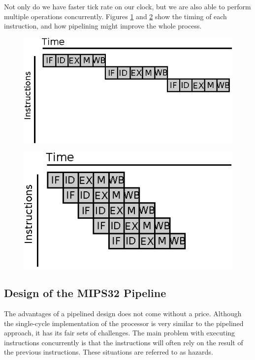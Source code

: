 Not only do we have faster tick rate on our clock, but we are also able to
perform multiple operations concurrently. Figures \ref{fig:single_cycle_time}
and \ref{fig:pipeline_time} show the timing of each instruction, and how
pipelining might improve the whole process.
\begin{figure}[H]
        \includegraphics{pipeline/single_cycle.eps}
        \label{fig:single_cycle_time}
\end{figure}
\begin{figure}[H]
        \includegraphics{pipeline/pipeline.eps}
        \label{fig:pipeline_time}
\end{figure}


\subsection{Design of the MIPS32 Pipeline}
The advantages of a pipelined design does not come without a price. Although
the single-cycle implementation of the processor is very similar to the
pipelined approach, it has its fair sets of challenges. The main problem with
executing instructions concurrently is that the instructions will often rely on
the result of the previous instructions. These situations are referred to as
hazards.

